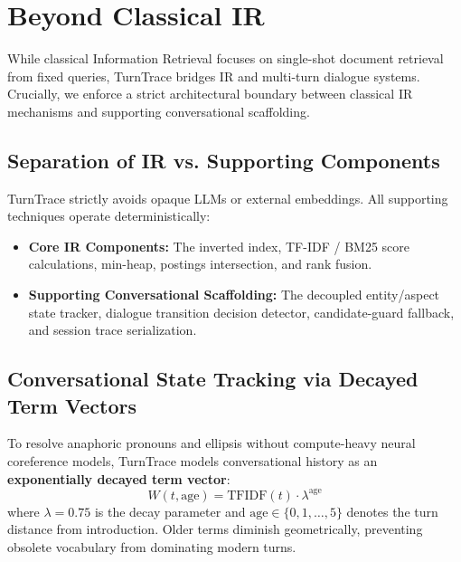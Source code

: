\documentclass[10pt,a4paper,twocolumn]{article}
\begin{document}
\section{Beyond Classical IR}
\label{sec:beyond_ir}

While classical Information Retrieval focuses on single-shot document retrieval from fixed queries, TurnTrace bridges IR and multi-turn dialogue systems. Crucially, we enforce a strict architectural boundary between classical IR mechanisms and supporting conversational scaffolding.

\subsection{Separation of IR vs. Supporting Components}
TurnTrace strictly avoids opaque LLMs or external embeddings. All supporting techniques operate deterministically:
\begin{itemize}
    \item \textbf{Core IR Components:} The inverted index, TF-IDF / BM25 score calculations, min-heap, postings intersection, and rank fusion.
    \item \textbf{Supporting Conversational Scaffolding:} The decoupled entity/aspect state tracker, dialogue transition decision detector, candidate-guard fallback, and session trace serialization.
\end{itemize}

\subsection{Conversational State Tracking via Decayed Term Vectors}
To resolve anaphoric pronouns and ellipsis without compute-heavy neural coreference models, TurnTrace models conversational history as an \textbf{exponentially decayed term vector}:
\begin{equation}
    W(t, \text{age}) = \text{TFIDF}(t) \cdot \lambda^{\text{age}}
\end{equation}
where $\lambda = 0.75$ is the decay parameter and $\text{age} \in \{0, 1, \dots, 5\}$ denotes the turn distance from introduction. Older terms diminish geometrically, preventing obsolete vocabulary from dominating modern turns.
\end{document}
